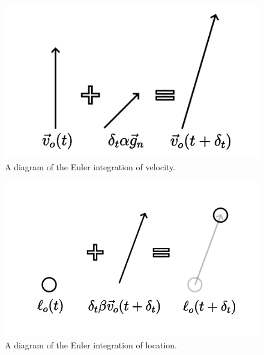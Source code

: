 \documentclass[12pt]{article}
\begin{document}
\pagebreak




\begin{figure} 
\centering
\label{fig7}
  \includegraphics[width = 6 in]{velocity.png}
  \caption{
A diagram of the Euler integration of velocity.
}
\end{figure}

\begin{figure} 
\centering
\label{fig8}
  \includegraphics[width = 6 in]{location.png}
  \caption{
A diagram of the Euler integration of location.
}
\end{figure}
\end{document}
